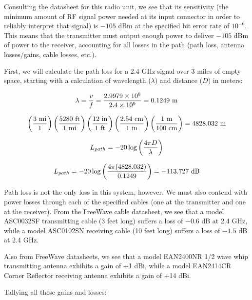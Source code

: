 





Consulting the datasheet for this radio unit, we see that its sensitivity (the minimum amount of RF signal power needed at its input connector in order to reliably interpret that signal) is $-105$ dBm at the specified bit error rate of $10^{-6}$.  This means that the transmitter must output enough power to deliver $-105$ dBm of power to the receiver, accounting for all losses in the path (path loss, antenna losses/gains, cable losses, etc.).

\vskip 10pt

First, we will calculate the path loss for a 2.4 GHz signal over 3 miles of empty space, starting with a calculation of wavelength ($\lambda$) and distance ($D$) in meters:

$$\lambda = {v \over f} = {2.9979 \times 10^8 \over 2.4 \times 10^9} = 0.1249 \hbox{ m}$$

$$\left(3 \hbox{ mi} \over 1 \right) \left(5280 \hbox{ ft} \over 1 \hbox{ mi} \right) \left(12 \hbox{ in} \over 1 \hbox{ ft} \right) \left(2.54 \hbox{ cm} \over 1 \hbox{ in} \right) \left(1 \hbox{ m} \over 100 \hbox{ cm} \right) = 4828.032 \hbox{ m}$$

$$L_{path} = -20 \log \left(4 \pi D \over \lambda \right)$$

$$L_{path} = -20 \log \left(4 \pi (4828.032) \over 0.1249 \right) = -113.727 \hbox{ dB}$$

\vskip 10pt

Path loss is not the only loss in this system, however.  We must also contend with power losses through each of the specified cables (one at the transmitter and one at the receiver).  From the FreeWave cable datasheet, we see that a model ASC0032SF transmitting cable (3 feet long) suffers a loss of $-0.6$ dB at 2.4 GHz, while a model ASC0102SN receiving cable (10 feet long) suffers a loss of $-1.5$ dB at 2.4 GHz.

\vskip 10pt

Also from FreeWave datasheets, we see that a model EAN2400NR 1/2 wave whip transmitting antenna exhibits a gain of +1 dBi, while a model EAN2414CR Corner Reflector receiving antenna exhibits a gain of +14 dBi.

\vskip 10pt

Tallying all these gains and losses:


